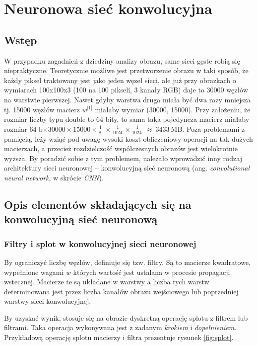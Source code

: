 \chapter{Neuronowa sieć konwolucyjna}
\label{chap:cnn}
\section{Wstęp}
\label{cnn-wstęp}
W przypadku zagadnień z dziedziny analizy obrazu, same sieci gęste robią się niepraktyczne. Teoretycznie możliwe jest przetworzenie obrazu w taki sposób, że każdy piksel traktowany jest jako jeden węzeł sieci,
ale już przy obrazkach o wymiarach 100x100x3 (100 na 100 pikseli, 3 kanały RGB) daje to 30000 węzłów na warstwie pierwszej. Nawet gdyby warstwa druga
miała być dwa razy mniejsza tj. 15000 węzłów macierz \(w^{\lbrack 1\rbrack}\) miałaby wymiar (30000, 15000). 
Przy założeniu, że rozmiar liczby typu double to 64 bity, to sama taka pojedyncza macierz miałaby rozmiar \(64\) \lbrack b\rbrack \(\times 30000 \times 15000 \times \frac{1}{8\ }\ \times \frac{1}{1024\ } \times \frac{1}{1024\ }\  \approx \ 3433\ \)\lbrack MB\rbrack. Poza problemami z pamięcią,
leży wziąć pod uwagę wysoki koszt obliczeniowy operacji na tak dużych macierzach, a przecież rozdzielczość współczesnych obrazów jest wielokrotnie wyższa. By poradzić sobie z tym problemem, należało wprowadzić inny rodzaj architektury sieci neuronowej -- konwolucyjną sieć neuronową (ang. \textit{convolutional neural network}, w skrócie \textit{CNN}).

\section{Opis elementów składających się na konwolucyjną sieć neuronową}
\label{opis-elementów-cnn}

\subsection{Filtry i splot w konwolucyjnej sieci neuronowej}

By ograniczyć liczbę węzłów, definiuje się tzw. filtry. Są to macierze kwadratowe, wypełnione wagami \(w\) których wartość jest ustalana w procesie propagacji wstecznej. Macierze te są układane w warstwy a liczba tych warstw determinowana jest przez liczba kanałów obrazu wejściowego lub poprzedniej warstwy sieci konwolucyjnej.

By uzyskać wynik, stosuje się na obrazie dyskretną operację splotu z filtrem lub filtrami. Taka operacja wykonywana jest z zadanym \emph{krokiem} i \emph{dopełnieniem}. Przykładową operację splotu macierzy i filtra prezentuje rysunek \ref{fig:splot}.

